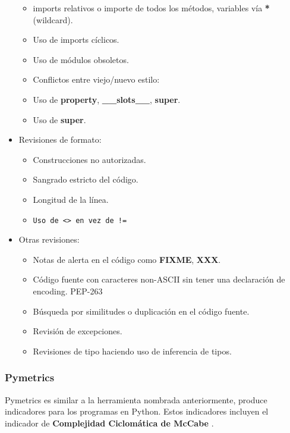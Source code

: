 \begin{itemize}
\begin{itemize}
    \item imports relativos o importe de todos los métodos, variables vía \textbf{*} (wildcard).
    \item Uso de imports cíclicos.
    \item Uso de módulos obsoletos.
    \item Conflictos entre viejo/nuevo estilo:
    \item Uso de \textbf{property}, \textbf{\_\_slots\_\_}, \textbf{super}.
    \item Uso de \textbf{super}.
    \end{itemize}
  \item Revisiones de formato:
    \begin{itemize}
    \item Construcciones no autorizadas.
    \item Sangrado estricto del código.
    \item Longitud de la línea.
    \item \lstinline{Uso de <> en vez de !=}
    \end{itemize}
  \item Otras revisiones:
    \begin{itemize}
    \item Notas de alerta en el código como \textbf{FIXME}, \textbf{XXX}.
    \item Código fuente con caracteres non-ASCII sin tener una declaración de encoding. PEP-263
    \item Búsqueda por similitudes o duplicación en el código fuente.
    \item Revisión de excepciones.
    \item Revisiones de tipo haciendo uso de inferencia de tipos.
    \end{itemize}
\end{itemize}

\subsubsection{Pymetrics}
Pymetrics es similar a la herramienta nombrada anteriormente, produce indicadores para los programas en Python. Estos indicadores incluyen  el indicador de \textbf{Complejidad Ciclomática de McCabe} \cite{URL:McCabe}.
